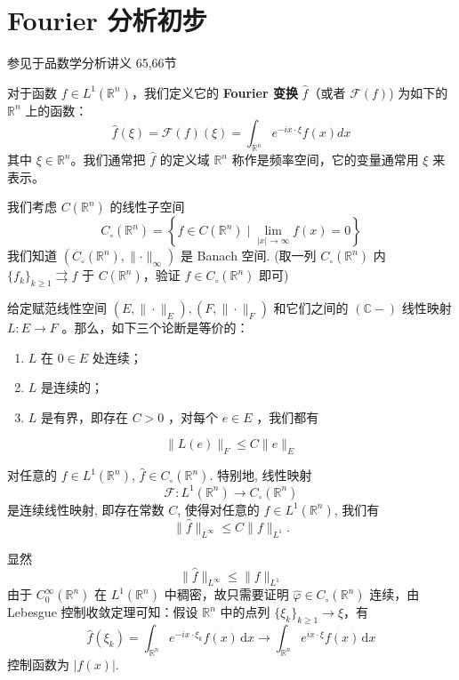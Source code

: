 \section{Fourier 分析初步}

参见于品数学分析讲义 65,66节

\begin{definition}
对于函数 $f \in L^1\left(\mathbb{R}^n\right)$，我们定义它的 \textbf{Fourier 变换} $\widehat{f}$（或者 $\mathcal{F}(f)$) 为如下的 $\mathbb{R}^n$ 上的函数：
\[
\widehat{f}(\xi)=\mathcal{F}(f)(\xi)=\int_{\mathbb{R}^n} e^{-i x \cdot \xi} f(x) d x
\]其中 $\xi \in \mathbb{R}^n$。我们通常把 $\widehat{f}$ 的定义域 $\mathbb{R}^n$ 称作是频率空间，它的变量通常用 $\xi$ 来表示。
\end{definition}
我们考虑 $C\left(\mathbb{R}^n\right)$ 的线性子空间
\[
C_{\circ}\left(\mathbb{R}^n\right)=\left\{f \in C\left(\mathbb{R}^n\right) \mid \lim _{|x| \rightarrow \infty} f(x)=0\right\}
\]
我们知道 $(C_{\circ}(\mathbb{R}^{n}),\lVert \cdot \rVert_{\infty})$ 是 Banach 空间. (取一列 $C_{\circ}(\mathbb{R}^{n})$ 内 $\{ f_k \}_{k\geq1}\rightrightarrows f$ 于 $C(\mathbb{R}^{n})$，验证 $f\in C_{\circ}(\mathbb{R}^{n})$ 即可)

\begin{lemma}[引理 335]
给定赋范线性空间 $\left(E,\|\cdot\|_E\right),\left(F,\|\cdot\|_F\right)$ 和它们之间的 $(\mathbb{C}-)$ 线性映射 $L: E \rightarrow F$ 。那么，如下三个论断是等价的：
	\begin{enumerate}
		\item $L$ 在 $0 \in E$ 处连续；
		\item $L$ 是连续的；
		\item $L$ 是有界，即存在 $C>0$ ，对每个 $e \in E$ ，我们都有
	\end{enumerate}
\[
\|L(e)\|_F \leqslant C\|e\|_E
\]
\end{lemma}
\begin{theorem}[Theorem 4.48]
对任意的 $f \in L^1(\mathbb{R}^n)$, $\widehat{f} \in C_{\circ}(\mathbb{R}^n)$. 特别地, 线性映射
\[
\mathcal{F}: L^1(\mathbb{R}^n) \longrightarrow C_{\circ}(\mathbb{R}^n)
\]是连续线性映射, 即存在常数 $C$, 使得对任意的 $f \in L^1(\mathbb{R}^n)$, 我们有
\[
\|\widehat{f}\|_{L^{\infty}} \leqslant C\|f\|_{L^1}.
\]
\end{theorem}
显然
\[
\lVert \widehat{f} \rVert _{L^{\infty}}\leq \lVert f \rVert _{L^{1}}
\]
由于 $C_{0}^{\infty}(\mathbb{R}^{n})$ 在 $L^{1}(\mathbb{R}^{n})$ 中稠密，故只需要证明 $\widehat{\varphi}\in C_{\circ}(\mathbb{R}^{n})$ 连续，由 Lebesgue 控制收敛定理可知：假设 $\mathbb{R}^{n}$ 中的点列 $\{ \xi _k \}_{k\geq1}\to \xi$，有
\[
\widehat{f}(\xi _k)=\int_{\mathbb{R}^{n}}^{} e^{ -ix\cdot \xi _k }f(x) \, \mathrm{d}x \to\int_{\mathbb{R}^{n}}^{} e^{ ix\cdot \xi }f(x) \, \mathrm{d}x 
\]
控制函数为 $\lvert f(x) \rvert$.

